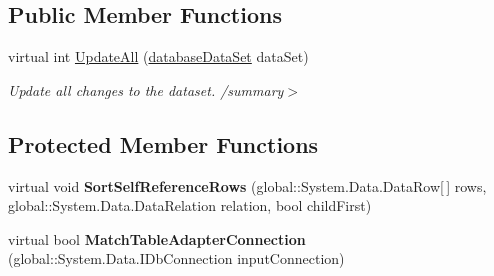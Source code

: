 \subsection*{Public Member Functions}
\begin{DoxyCompactItemize}
\item 
\mbox{\label{classprojekt__grupowy_1_1database_data_set_table_adapters_1_1_table_adapter_manager_aeffb3289e6b09ed0725b06ba7dae5b52}} 
virtual int \hyperlink{classprojekt__grupowy_1_1database_data_set_table_adapters_1_1_table_adapter_manager_aeffb3289e6b09ed0725b06ba7dae5b52}{Update\+All} (\hyperlink{classprojekt__grupowy_1_1database_data_set}{database\+Data\+Set} data\+Set)
\begin{DoxyCompactList}\small\item\em Update all changes to the dataset. /summary$>$ \end{DoxyCompactList}\end{DoxyCompactItemize}
\subsection*{Protected Member Functions}
\begin{DoxyCompactItemize}
\item 
\mbox{\label{classprojekt__grupowy_1_1database_data_set_table_adapters_1_1_table_adapter_manager_a9b1c956b09f3a4bb72df5b7487361383}} 
virtual void {\bfseries Sort\+Self\+Reference\+Rows} (global\+::\+System.\+Data.\+Data\+Row\mbox{[}$\,$\mbox{]} rows, global\+::\+System.\+Data.\+Data\+Relation relation, bool child\+First)
\item 
\mbox{\label{classprojekt__grupowy_1_1database_data_set_table_adapters_1_1_table_adapter_manager_a22bf35dba90267bdad45f13f88a71da8}} 
virtual bool {\bfseries Match\+Table\+Adapter\+Connection} (global\+::\+System.\+Data.\+I\+Db\+Connection input\+Connection)
\end{DoxyCompactItemize}
